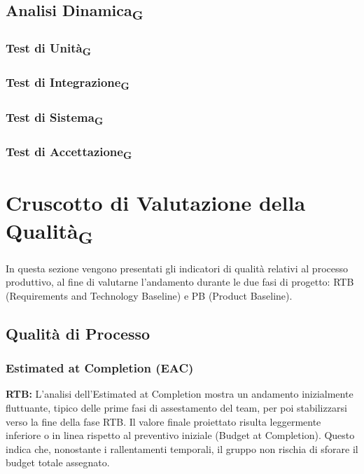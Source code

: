 \documentclass[11pt,a4paper]{article}
\begin{document}
\newpage
\subsection{Analisi Dinamica\textsubscript{G}}
\subsubsection{Test di Unità\textsubscript{G}}

\subsubsection{Test di Integrazione\textsubscript{G}}

\subsubsection{Test di Sistema\textsubscript{G}}

\subsubsection{Test di Accettazione\textsubscript{G}}



\newpage
\section{Cruscotto di Valutazione della Qualità\textsubscript{G}}
In questa sezione vengono presentati gli indicatori di qualità relativi al processo produttivo, al fine di valutarne l'andamento durante le due fasi di progetto: RTB (Requirements and Technology Baseline) e PB (Product Baseline).

\subsection{Qualità di Processo}

\subsubsection{Estimated at Completion (EAC)}

\textbf{RTB:} L'analisi dell'Estimated at Completion mostra un andamento inizialmente fluttuante, tipico delle prime fasi di assestamento del team, per poi stabilizzarsi verso la fine della fase RTB. Il valore finale proiettato risulta leggermente inferiore o in linea rispetto al preventivo iniziale (Budget at Completion). Questo indica che, nonostante i rallentamenti temporali, il gruppo non rischia di sforare il budget totale assegnato.
\end{document}
